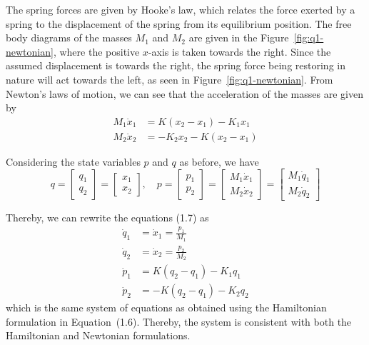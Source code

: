 The spring forces are given by Hooke's law, which relates the force exerted by a spring to the displacement of the spring from its equilibrium position.
The free body diagrams of the masses \(M_1\) and \(M_2\) are given in the Figure~\ref{fig:q1-newtonian}, where the positive \(x\)-axis is taken towards the right.
Since the assumed displacement is towards the right, the spring force being restoring in nature will act towards the left, as seen in Figure~\ref{fig:q1-newtonian}.
From Newton's laws of motion, we can see that the acceleration of the masses are given by
\[
    \begin{aligned}
        M_1 \ddot x_1 & = K (x_2 - x_1) - K_1 x_1  \\
        M_2 \ddot x_2 & = -K_2 x_2 - K (x_2 - x_1)
    \end{aligned}
    \tag{1.7}
\]

Considering the state variables \(p\) and \(q\) as before, we have
\[
    q = \begin{bmatrix} q_1 \\ q_2 \end{bmatrix} = \begin{bmatrix} x_1 \\ x_2 \end{bmatrix},
    \quad
    p = \begin{bmatrix} p_1 \\ p_2 \end{bmatrix} = \begin{bmatrix} M_1 \dot x_1 \\ M_2 \dot x_2 \end{bmatrix} = \begin{bmatrix} M_1 \dot q_1 \\ M_2 \dot q_2 \end{bmatrix}
\]

Thereby, we can rewrite the equations (1.7) as
\[
    \begin{aligned}
        \dot q_1 & = \dot x_1 = \frac{p_1}{M_1} \\
        \dot q_2 & = \dot x_2 = \frac{p_2}{M_2} \\
        \dot p_1 & = K (q_2 - q_1) - K_1 q_1    \\
        \dot p_2 & = -K (q_2 - q_1) - K_2 q_2
    \end{aligned}
\]
which is the same system of equations as obtained using the Hamiltonian formulation in Equation~(1.6).
Thereby, the system is consistent with both the Hamiltonian and Newtonian formulations.
